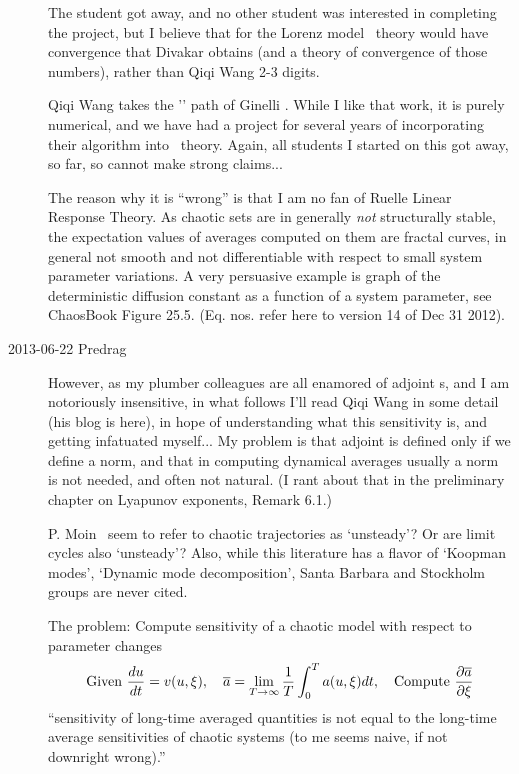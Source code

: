 \begin{description}
The student got away, and no other student was interested in
completing the project, but I believe that for the Lorenz model \po\
theory would have convergence that Divakar obtains (and a
theory of convergence of those numbers), rather than Qiqi
Wang 2-3 digits.

Qiqi Wang takes the '{\cLvs}' path of
Ginelli \etal{}. While I like that work, it is
purely numerical, and we have had a project for several years of
incorporating their algorithm into \po\ theory. Again, all students I
started on this got away, so far, so cannot make strong claims...

The reason why it is ``wrong'' is that I am no fan of
Ruelle Linear Response Theory. As chaotic sets
are in generally \emph{not} structurally stable, the expectation
values of averages computed on them are fractal curves, in general
not smooth and not differentiable with respect to small system
parameter variations.
A very persuasive example is graph of the deterministic diffusion
constant as a function of a system parameter, see ChaosBook
Figure 25.5. (Eq. nos. refer here to
 {version 14} of Dec
31 2012).

\item[2013-06-22 Predrag]
However, as my plumber colleagues are all enamored of adjoint
\evOper s, and I am notoriously insensitive,
in what follows I'll
read Qiqi Wang in some detail (his blog is
 {here}), in hope of understanding
what this sensitivity is, and
getting infatuated myself... My problem is that adjoint is defined
only if we define a norm, and that in computing dynamical averages
usually a norm is not needed, and often not natural. (I rant about that
in the preliminary chapter on
 {Lyapunov exponents},
Remark 6.1.)

                                        \toCB
P. Moin \etal\ seem to refer to chaotic trajectories as `unsteady'?
Or are limit cycles also `unsteady'? Also, while this literature has
a flavor of `Koopman modes', `Dynamic mode decomposition', Santa
Barbara and Stockholm groups are never cited.

The problem: Compute sensitivity of a chaotic
model with respect to parameter changes
\begin{equation}
\mbox{Given } \frac{du}{dt} = v(u, \xi), \quad
\overline{a} = \lim_{T\rightarrow\infty} \frac1T \int_0^T a(u,\xi)
dt,\quad
\mbox{Compute } \frac{\partial \overline{a}}{\partial \xi}
\label{e:gen_problem}
\end{equation}
``sensitivity of long-time averaged quantities is not equal to the long-time average sensitivities of chaotic systems (to me 
seems naive, if not downright wrong).''



\end{description}
